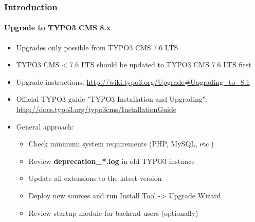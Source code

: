 \begin{frame}[fragile]
	\frametitle{Introduction}
	\framesubtitle{Upgrade to TYPO3 CMS 8.x}

	\begin{itemize}
		\item Upgrades only possible from TYPO3 CMS 7.6 LTS
		\item TYPO3 CMS < 7.6 LTS should be updated to TYPO3 CMS 7.6 LTS first
	\end{itemize}

	\begin{itemize}

		\item Upgrade instructions:\newline
			\smaller\url{http://wiki.typo3.org/Upgrade#Upgrading_to_8.1}\normalsize
		\item Official TYPO3 guide "TYPO3 Installation and Upgrading":
			\smaller\url{http://docs.typo3.org/typo3cms/InstallationGuide}\normalsize
		\item General approach:
			\begin{itemize}
				\item Check minimum system requirements \small(PHP, MySQL, etc.)
				\item Review \textbf{deprecation\_*.log} in old TYPO3 instance
				\item Update all extensions to the latest version
				\item Deploy new sources and run Install Tool -> Upgrade Wizard
				\item Review startup module for backend users (optionally)
			\end{itemize}
	\end{itemize}

\end{frame}


